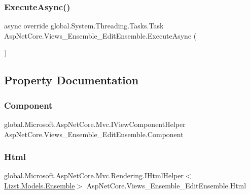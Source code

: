 \subsubsection{\texorpdfstring{ExecuteAsync()}{ExecuteAsync()}}
{\footnotesize\ttfamily async override global.\+System.\+Threading.\+Tasks.\+Task Asp\+Net\+Core.\+Views\+\_\+\+Ensemble\+\_\+\+Edit\+Ensemble.\+Execute\+Async (\begin{DoxyParamCaption}{ }\end{DoxyParamCaption})}



\subsection{Property Documentation}
\mbox{\label{class_asp_net_core_1_1_views___ensemble___edit_ensemble_a25a527d2774107f622d3df2ecb2257aa}} 
\subsubsection{\texorpdfstring{Component}{Component}}
{\footnotesize\ttfamily global.\+Microsoft.\+Asp\+Net\+Core.\+Mvc.\+I\+View\+Component\+Helper Asp\+Net\+Core.\+Views\+\_\+\+Ensemble\+\_\+\+Edit\+Ensemble.\+Component\hspace{0.3cm}{\ttfamily [get]}}

\mbox{\label{class_asp_net_core_1_1_views___ensemble___edit_ensemble_aefe07dd49af5fd1354c8ca961c81178f}} 
\subsubsection{\texorpdfstring{Html}{Html}}
{\footnotesize\ttfamily global.\+Microsoft.\+Asp\+Net\+Core.\+Mvc.\+Rendering.\+I\+Html\+Helper$<$\mbox{\hyperlink{class_lizst_1_1_models_1_1_ensemble}{Lizst.\+Models.\+Ensemble}}$>$ Asp\+Net\+Core.\+Views\+\_\+\+Ensemble\+\_\+\+Edit\+Ensemble.\+Html\hspace{0.3cm}{\ttfamily [get]}}


